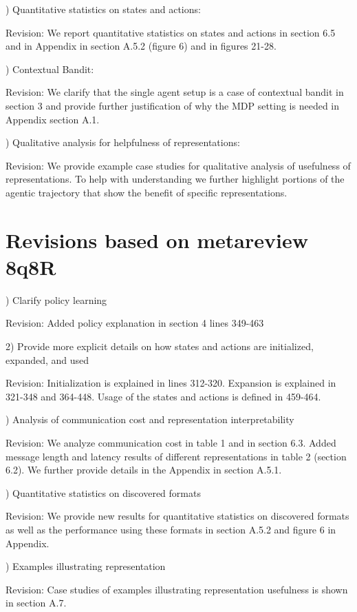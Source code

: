 \documentclass[11pt]{article}
\begin{document}
) Quantitative statistics on states and actions:

Revision: We report quantitative statistics on states and actions in section 6.5 and in Appendix in section A.5.2 (figure 6) and in figures 21-28.

) Contextual Bandit:

Revision: We clarify that the single agent setup is a case of contextual bandit in section 3 and provide further justification of why the MDP setting is needed in Appendix section A.1.

) Qualitative analysis for helpfulness of representations:

Revision: We provide example case studies for qualitative analysis of usefulness of representations. To help with understanding we further highlight portions of the agentic trajectory that show the benefit of specific representations.


\section{Revisions based on metareview 8q8R}

) Clarify policy learning

Revision: Added policy explanation in section 4 lines 349-463

2) Provide more explicit details on how states and actions are initialized, expanded, and used

Revision: Initialization is explained in lines 312-320. Expansion is explained in 321-348 and 364-448. Usage of the states and actions is defined in 459-464. 

) Analysis of communication cost and representation interpretability 

Revision: We analyze communication cost in table 1 and in section 6.3. Added message length and latency results of different representations in table 2 (section 6.2). We further provide details in the Appendix in section A.5.1.

) Quantitative statistics on discovered formats

Revision: We provide new results for quantitative statistics on discovered formats as well as the performance using these formats in section A.5.2 and figure 6 in Appendix.

) Examples illustrating representation

Revision: Case studies of examples illustrating representation usefulness is shown in section A.7.
\end{document}
